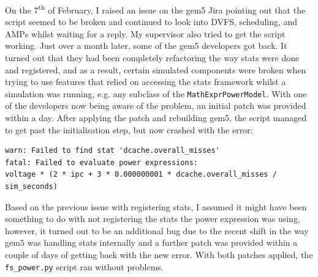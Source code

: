 On the 7\textsuperscript{th} of February, I raised an issue on the gem5 Jira 
pointing out that the script seemed to be broken \cite{hansen_gem5-319_2020} and
continued to look into DVFS, scheduling, and AMPs whilst waiting for a reply. My
supervisor also tried to get the script working. Just over a month later, some
of the gem5 developers got back. It turned out that they had been completely 
refactoring the way stats were done and registered, and as a result, certain 
simulated components were broken when trying to use features that relied on 
accessing the stats framework whilst a simulation was running, e.g. any 
subclass of the \texttt{MathExprPowerModel}. With one of the developers now 
being aware of the problem, an initial patch was provided within a day. After 
applying the patch and rebuilding gem5, the script managed to get past the 
initialisation step, but now crashed with the error:
\begin{lstlisting}[basicstyle=\sffamily\footnotesize]
warn: Failed to find stat 'dcache.overall_misses'
fatal: Failed to evaluate power expressions:
voltage * (2 * ipc + 3 * 0.000000001 * dcache.overall_misses / sim_seconds)
\end{lstlisting}
Based on the previous issue with registering stats, I assumed it might have been
something to do with not registering the stats the power expression was using, 
however, it turned out to be an additional bug due to the recent shift in the 
way gem5 was handling stats internally and a further patch was provided within 
a couple of days of getting back with the new error. With both patches applied, 
the \texttt{fs\_power.py} script ran without problems.

